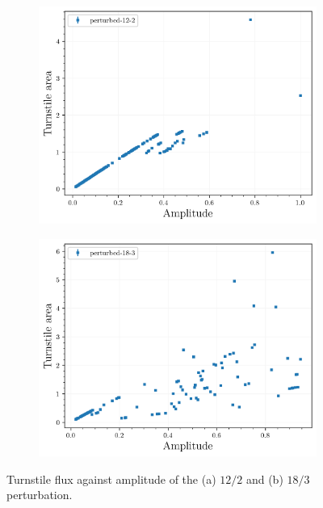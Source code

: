 \begin{figure}[H]
    \centering
    \begin{subfigure}{0.49\textwidth}
        \centering
        \includegraphics[width=\textwidth]{images/amplitudescan/turnstile_area_12_2.png}
        \caption{}
        \label{fig:scan-12-2}
    \end{subfigure}
    \begin{subfigure}{0.49\textwidth}
        \centering
        \includegraphics[width=\textwidth]{images/amplitudescan/turnstile_area_18_3.png}
        \caption{}
        \label{fig:scan-18-3}
    \end{subfigure}
    \caption{Turnstile flux against amplitude of the (a) $12/2$ and (b) $18/3$ perturbation.}
    \label{fig:amp-scan}
\end{figure}


